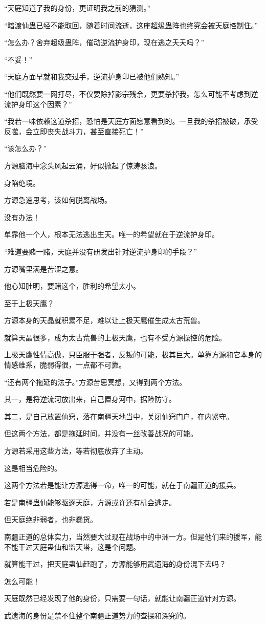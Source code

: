 \begin{this_body}
“天庭知道了我的身份，更证明我之前的猜测。”

“暗渡仙蛊已经不能取回，随着时间流逝，这座超级蛊阵也终究会被天庭控制住。”

“怎么办？舍弃超级蛊阵，催动逆流护身印，现在逃之夭夭吗？”

“不妥！”

“天庭方面早就和我交过手，逆流护身印已被他们熟知。”

“他们既然要一网打尽，不仅要除掉影宗残余，更要杀掉我。怎么可能不考虑到逆流护身印这个因素？”

“我若一味依赖这道杀招，恐怕是天庭方面愿意看到的。一旦我的杀招被破，承受反噬，会立即丧失战斗力，甚至直接死亡！”

“该怎么办？”

方源脑海中念头风起云涌，好似掀起了惊涛骇浪。

身陷绝境。

方源急速思考，该如何脱离战场。

没有办法！

单靠他一个人，根本无法逃出生天。唯一的希望就在于逆流护身印。

“难道要赌一赌，天庭并没有研发出针对逆流护身印的手段？”

方源嘴里满是苦涩之意。

他心知肚明，要赌这个，胜利的希望太小。

至于上极天鹰？

方源本身的天晶就积累不足，难以让上极天鹰催生成太古荒兽。

就算天晶很多，成为太古荒兽的上极天鹰，也有不受方源操控的危险。

上极天鹰性情高傲，只臣服于强者，反叛的可能，极其巨大。单靠方源和它本身的情感维系，脆弱得很，一点都不可靠。

“还有两个拖延的法子。”方源苦思冥想，又得到两个方法。

其一，是将逆流河放出来，自己置身河中，据险防守。

其二，是自己放置仙窍，落在南疆天地当中，关闭仙窍门户，在内紧守。

但这两个方法，都是拖延时间，并没有一丝改善战况的可能。

方源若采用这些方法，等若彻底放弃了主动。

这是相当危险的。

这两个方法若是能让方源逃得一命，唯一的可能，就在于南疆正道的援兵。

若是南疆蛊仙能够驱逐天庭，方源或许还有机会逃走。

但天庭绝非弱者，也非蠢货。

南疆正道的总体实力，当然要大过现在战场中的中洲一方。但是他们来的援军，能不能干过天庭蛊仙和监天塔，这是个问题。

就算能干过，把天庭蛊仙赶跑了，方源能够用武遗海的身份混下去吗？

怎么可能！

天庭既然已经发现了他的身份，只需要一句话，就能让南疆正道针对方源。

武遗海的身份是禁不住整个南疆正道势力的查探和深究的。

\end{this_body}


